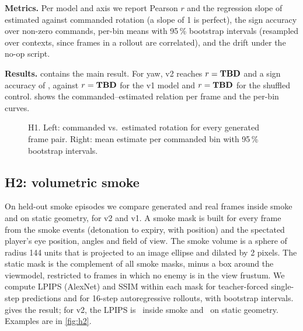 \textbf{Metrics.}
Per model and axis we report Pearson $r$ and the regression slope of estimated against commanded rotation (a slope of 1 is perfect), the sign accuracy over non-zero commands, per-bin means with 95\,\% bootstrap intervals (resampled over contexts, since frames in a rollout are correlated), and the drift under the no-op script.

\textbf{Results.}
 contains the main result.
For yaw, v2 reaches $r=\textbf{TBD}$ and a sign accuracy of \TBDhOneSignVtwo, against $r=\textbf{TBD}$ for the v1 model and $r=\textbf{TBD}$ for the shuffled control.
 shows the commanded--estimated relation per frame and the per-bin curves.

\begin{table}[t]
  \centering\small
  \caption{H1 controllability. Estimated vs.\ commanded rotation under scripted inputs, 50 held-out contexts.}
  \label{tab:h1}
\end{table}

\begin{figure}[t]
  \centering
  \begin{minipage}[t]{0.49\textwidth}\centering
  \end{minipage}\hfill
  \begin{minipage}[t]{0.49\textwidth}\centering
  \end{minipage}
  \caption{H1. Left: commanded vs.\ estimated rotation for every generated frame pair. Right: mean estimate per commanded bin with 95\,\% bootstrap intervals.}
  \label{fig:h1}
\end{figure}

\subsection{H2: volumetric smoke}
\label{sec:h2}
On held-out smoke episodes we compare generated and real frames inside smoke and on static geometry, for v2 and v1.
A smoke mask is built for every frame from the smoke events (detonation to expiry, with position) and the spectated player's eye position, angles and field of view.
The smoke volume is a sphere of radius 144 units that is projected to an image ellipse and dilated by 2 pixels.
The static mask is the complement of all smoke masks, minus a box around the viewmodel, restricted to frames in which no enemy is in the view frustum.
We compute LPIPS (AlexNet) and SSIM within each mask for teacher-forced single-step predictions and for 16-step autoregressive rollouts, with bootstrap intervals.
 gives the result; for v2, the \TBDhTwoCondition LPIPS is \TBDhTwoSmoke\ inside smoke and \TBDhTwoStatic\ on static geometry.
Examples are in \cref{fig:h2}.


